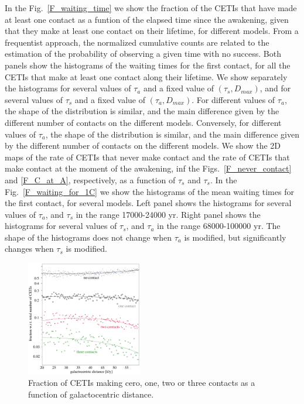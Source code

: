 \documentclass[crop]{CSLB}%
\begin{document}
In the Fig.~\ref{F_waiting_time} we show the fraction of the CETIs
that have made at least one contact as a funtion of the elapsed time
since the awakening, given that they make at least one contact on
their lifetime, for different models.
%
From a frequentist approach, the normalized cumulative counts are
related to the estimation of the probability of observing a given time
with no success.
%             
Both panels show the histograms of the waiting times for the first
contact, for all the CETIs that make at least one contact along their
lifetime.
%
We show separately the histograms for several values of $\tau_a$ and a
fixed value of $(\tau_s, D_{max})$, and for several values of $\tau_s$
and a fixed value of $(\tau_a, D_{max})$.
%
For different values of $\tau_a$, the shape of the distribution is
similar, and the main difference given by the different number of
contacts on the different models.
%
Conversely, for different values of $\tau_a$, the shape of the
distribution is similar, and the main difference given by the
different number of contacts on the different models. 
%
We show the 2D maps of the rate of CETIs that never make contact and
the rate of CETIs that make contact at the moment of the awakening,
inf the Figs.~\ref{F_never_contact} and \ref{F_C_at_A}, respectively,
as a function of $\tau_s$ and $\tau_s$.
%
In the Fig.~\ref{F_waiting_for_1C} we show the histograms of the mean
waiting times for the first contact, for several models.
%
Left panel shows the histograms for several values of $\tau_a$, and
$\tau_s$ in the range 17000-24000 yr.
%
Right panel shows the histograms for several values of $\tau_s$, and
$\tau_a$ in the range 68000-100000 yr.
%
The shape of the histograms does not change when $\tau_a$ is modified,
but significantly changes when $\tau_s$ is modified.


         
                   
\begin{figure}
   \centering
   \includegraphics[width=0.45\textwidth]{galactocentric_frac.pdf}
   \caption{Fraction of CETIs making cero, one, two or three contacts
   as a function of galactocentric distance.}
   \label{F_radial_frac}
\end{figure}
           
\end{document}
